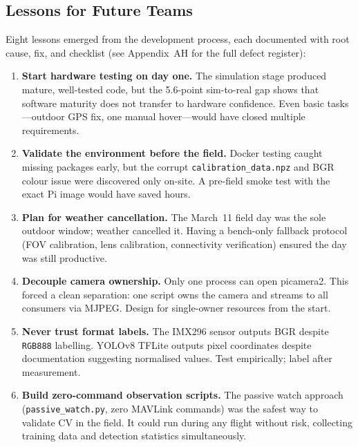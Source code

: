 \subsection{Lessons for Future Teams}\label{sec:lessons-future}

Eight lessons emerged from the development process, each documented
with root cause, fix, and checklist (see Appendix~AH for the full
defect register):

\begin{enumerate}[leftmargin=1.5em]
  \item \textbf{Start hardware testing on day one.}  The simulation
        stage produced mature, well-tested code, but the 5.6-point
        sim-to-real gap shows that software maturity does not transfer
        to hardware confidence.  Even basic tasks---outdoor GPS fix,
        one manual hover---would have closed multiple requirements.

  \item \textbf{Validate the environment before the field.}  Docker
        testing caught missing packages early, but the corrupt
        \texttt{calibration\_data.npz} and BGR colour issue were
        discovered only on-site.  A pre-field smoke test with the exact
        Pi image would have saved hours.

  \item \textbf{Plan for weather cancellation.}  The March~11 field
        day was the sole outdoor window; weather cancelled it.  Having a
        bench-only fallback protocol (FOV calibration, lens calibration,
        connectivity verification) ensured the day was still productive.

  \item \textbf{Decouple camera ownership.}  Only one process can open
        picamera2.  This forced a clean separation: one script owns the
        camera and streams to all consumers via MJPEG.  Design for
        single-owner resources from the start.

  \item \textbf{Never trust format labels.}  The IMX296 sensor
        outputs BGR despite \texttt{RGB888} labelling.  YOLOv8 TFLite
        outputs pixel coordinates despite documentation suggesting
        normalised values.  Test empirically; label after measurement.

  \item \textbf{Build zero-command observation scripts.}  The passive
        watch approach (\texttt{passive\_watch.py}, zero MAVLink
        commands) was the safest way to validate CV in the field.  It
        could run during any flight without risk, collecting training
        data and detection statistics simultaneously.


\end{enumerate}
